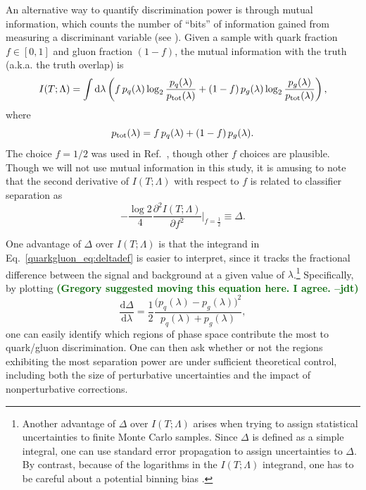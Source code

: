 \documentclass[11pt]{cernrep}
\newcommand{\jdt}[1]{\textbf{\textcolor{darkgreen}{(#1 --jdt)}}}
\begin{document}
An alternative way to quantify discrimination power is through mutual information, which counts the number of ``bits'' of information gained from measuring a discriminant variable (see \cite{Larkoski:2014pca}).  Given a sample with quark fraction $f \in [0,1]$ and gluon fraction $(1-f)$, the mutual information with the truth (a.k.a. the truth overlap) is
\begin{equation}
I(T; \Lambda) = \int \text{d} \lambda \left(f \, p_q(\lambda) \log_2 \frac{p_q(\lambda)}{p_{\rm tot}(\lambda)} + (1-f) \, p_g(\lambda) \log_2 \frac{p_g(\lambda)}{p_{\rm tot}(\lambda)}   \right),
\end{equation}
where
\begin{equation}
p_{\rm tot}(\lambda) = f \, p_q(\lambda) + (1-f) \, p_g(\lambda).
\end{equation}
The choice $f = 1/2$ was used in Ref.~\cite{Larkoski:2014pca}, though other $f$ choices are plausible.  Though we will not use mutual information in this study, it is amusing to note that the second derivative of $I(T;\Lambda)$ with respect to $f$ is related to classifier separation as
\begin{equation}
\label{quarkgluon_eq:altdeltadef}
- \frac{\log 2}{4} \frac{\partial^2 I(T;\Lambda)}{\partial f^2} \Big|_{f = \frac{1}{2}} \equiv \Delta.
\end{equation}

One advantage of $\Delta$ over $I(T;\Lambda)$ is that the integrand in Eq.~\eqref{quarkgluon_eq:deltadef} is easier to interpret, since it tracks the fractional difference between the signal and background at a given value of $\lambda$.\footnote{Another advantage of $\Delta$ over $I(T; \Lambda)$ arises when trying to assign statistical uncertainties to finite Monte Carlo samples.  Since $\Delta$ is defined as a simple integral, one can use standard error propagation to assign uncertainties to $\Delta$.  By contrast, because of the logarithms in the $I(T; \Lambda)$ integrand, one has to be careful about a potential binning bias \cite{Larkoski:2014pca}.}  Specifically, by plotting \jdt{Gregory suggested moving this equation here.  I agree.}
\begin{equation}
\label{quarkgluon_eq:deltaintegrand}
\frac{\text{d} \Delta}{\text{d} \lambda} = \frac{1}{2} \frac{\bigl(p_q(\lambda) - p_g(\lambda) \bigr)^2}{p_q(\lambda) + p_g(\lambda)},
\end{equation}
one can easily identify which regions of phase space contribute the most to quark/gluon discrimination.  One can then ask whether or not the regions exhibiting the most separation power are under sufficient theoretical control, including both the size of perturbative uncertainties and the impact of nonperturbative corrections.  
\end{document}
